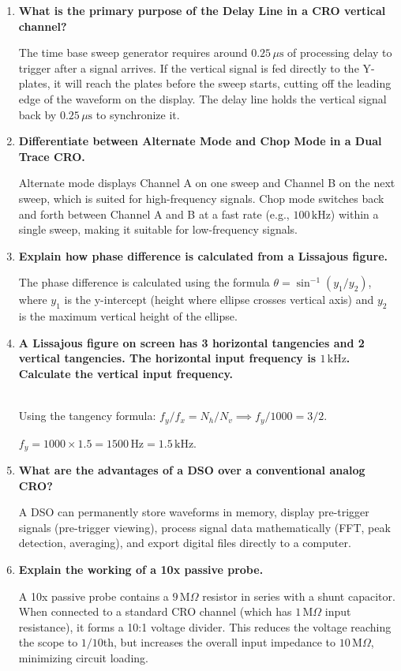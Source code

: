 \documentclass[12pt,a4paper]{article}
\newcommand{\Q}[1]{\textbf{#1}\par\noindent\ignorespaces}
\begin{document}
\begin{tcolorbox}[exambox, title={\textbf{Frequently Asked / Viva Questions}}]
\begin{enumerate}[topsep=0pt, label=\textbf{Q\arabic*.}, itemsep=5pt]
  \item \Q{What is the primary purpose of the Delay Line in a CRO vertical channel?}
    The time base sweep generator requires around $0.25\,\mu\text{s}$ of processing delay to trigger after a signal arrives. If the vertical signal is fed directly to the Y-plates, it will reach the plates before the sweep starts, cutting off the leading edge of the waveform on the display. The delay line holds the vertical signal back by $0.25\,\mu\text{s}$ to synchronize it.
  \item \Q{Differentiate between Alternate Mode and Chop Mode in a Dual Trace CRO.}
    Alternate mode displays Channel A on one sweep and Channel B on the next sweep, which is suited for high-frequency signals. Chop mode switches back and forth between Channel A and B at a fast rate (e.g., $100\,\text{kHz}$) within a single sweep, making it suitable for low-frequency signals.
  \item \Q{Explain how phase difference is calculated from a Lissajous figure.}
    The phase difference is calculated using the formula $\theta = \sin^{-1}(y_1/y_2)$, where $y_1$ is the y-intercept (height where ellipse crosses vertical axis) and $y_2$ is the maximum vertical height of the ellipse.
  \item \Q{A Lissajous figure on screen has 3 horizontal tangencies and 2 vertical tangencies. The horizontal input frequency is $1\,\text{kHz}$. Calculate the vertical input frequency.}\\
    Using the tangency formula: $f_y / f_x = N_h / N_v \implies f_y / 1000 = 3 / 2$.\par
    $f_y = 1000 \times 1.5 = 1500\,\text{Hz} = 1.5\,\text{kHz}$.
  \item \Q{What are the advantages of a DSO over a conventional analog CRO?}
    A DSO can permanently store waveforms in memory, display pre-trigger signals (pre-trigger viewing), process signal data mathematically (FFT, peak detection, averaging), and export digital files directly to a computer.
  \item \Q{Explain the working of a 10x passive probe.}
    A 10x passive probe contains a $9\,\text{M}\Omega$ resistor in series with a shunt capacitor. When connected to a standard CRO channel (which has $1\,\text{M}\Omega$ input resistance), it forms a 10:1 voltage divider. This reduces the voltage reaching the scope to $1/10$th, but increases the overall input impedance to $10\,\text{M}\Omega$, minimizing circuit loading.

\end{enumerate}
\end{tcolorbox}
\end{document}
